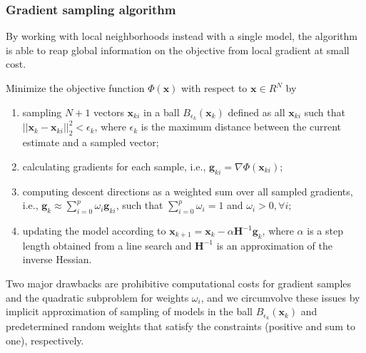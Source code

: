 \documentclass{article}
\newcommand{\mbf}[1]{\mathbf{#1}}
\begin{document}
\subsubsection{Gradient sampling algorithm}
By working with local neighborhoods instead with a single model, the algorithm is able to reap global information on the objective from local gradient at small cost.\par
Minimize the objective function $\Phi(\mbf x)$ with respect to $\mbf x\in R^N$ by
\begin{enumerate}[\hspace{10mm}$\bullet$]
  \item sampling $N+1$ vectors $\mbf x_{ki}$ in a ball $B_{\epsilon_k}(\mbf x_k)$ defined as all $\mbf x_{ki}$ such that $||\mbf x_k-\mbf x_{ki}||_2^2<\epsilon_k$, where $\epsilon_k$ is the maximum distance between the current estimate and a sampled vector;
  \item calculating gradients for each sample, i.e., $\mbf g_{ki}=\nabla\Phi(\mbf x_{ki})$;
  \item computing descent directions as a weighted sum over all sampled gradients, i.e., $\mbf g_k\approx\sum\limits_{i=0}^p\omega_i\mbf g_{ki}$, such that $\sum\limits_{i=0}^p\omega_i=1$ and $\omega_i>0,\forall i$;
  \item updating the model according to $\mbf x_{k+1}=\mbf x_k-\alpha\mbf H^{-1}\mbf g_k$, where $\alpha$ is a step length obtained from a line search and $\mbf H^{-1}$ is an approximation of the inverse Hessian.
\end{enumerate}\par
Two major drawbacks are prohibitive computational costs for gradient samples and the quadratic subproblem for weights $\omega_i$, and we circumvolve these issues by implicit approximation of sampling of models in the ball $B_{\epsilon_k}(\mbf x_k)$ and predetermined random weights that satisfy the constraints (positive and sum to one), respectively.
\end{document}
